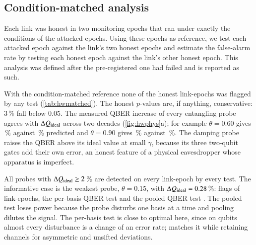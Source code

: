 \subsection{Condition-matched analysis}\label{sec:hw-matched}

Each link was honest in two monitoring epochs that ran under exactly the conditions of the attacked epochs. Using these epochs as reference, we test each attacked epoch against the link's two honest epochs and estimate the false-alarm rate by testing each honest epoch against the link's other honest epoch. This analysis was defined after the pre-registered one had failed and is reported as such.

With the condition-matched reference none of the \HwHonestN{} honest link-epochs was flagged by any test (\cref{tab:hwmatched}). The honest $p$-values are, if anything, conservative: 3\,\% fall below 0.05. The measured QBER increase of every entangling probe agrees with $\Delta Q_{\rm ideal}$ across two decades (\cref{fig:hwphys}a); for example $\theta=0.60$ gives \HwThetaDMeas\,\% against \HwThetaDIdeal\,\% predicted and $\theta=0.90$ gives \HwThetaEMeas\,\% against \HwThetaEIdeal\,\%. The damping probe raises the QBER above its ideal value at small $\gamma$, because its three two-qubit gates add their own error, an honest feature of a physical eavesdropper whose apparatus is imperfect.

\begin{table}[!tbp]
\centering
\caption{Hardware detection with the condition-matched reference: fraction of link-epochs flagged at $\alpha=10^{-3}$; $n$ is the number of link-epochs, $\Delta Q_{\rm ideal}$ the ideal and $\Delta Q_{\rm meas}$ the measured increase of the sifted QBER.}
\label{tab:hwmatched}
\small

\end{table}

All probes with $\Delta Q_{\rm ideal}\ge 2$\,\% are detected on every link-epoch by every test. The informative case is the weakest probe, $\theta=0.15$, with $\Delta Q_{\rm ideal}=0.28$\,\%: \qtrace{} flags \HwThetaAQT{} of \HwThetaAN{} link-epochs, the per-basis QBER test \HwThetaAQB{} and the pooled QBER test \HwThetaAQP. The pooled test loses power because the probe disturbs one basis at a time and pooling dilutes the signal. The per-basis test is close to optimal here, since on qubits almost every disturbance is a change of an error rate; \qtrace{} matches it while retaining channels for asymmetric and unsifted deviations.

